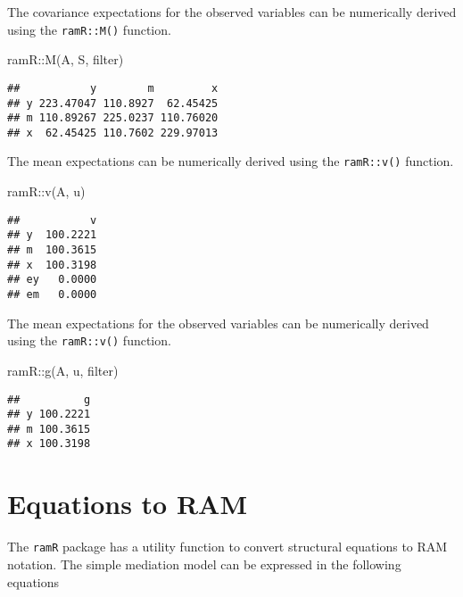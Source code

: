 \documentclass[
]{book}
\newenvironment{Shaded}{\begin{snugshade}}{\end{snugshade}}
\newcommand{\FunctionTok}[1]{\textcolor[rgb]{0.00,0.00,0.00}{#1}}
\newcommand{\NormalTok}[1]{#1}
\newcommand{\SpecialCharTok}[1]{\textcolor[rgb]{0.00,0.00,0.00}{#1}}
\theoremstyle{definition}
\theoremstyle{definition}
\theoremstyle{definition}
\theoremstyle{remark}
\begin{document}
The covariance expectations for the observed variables
can be numerically derived using the \texttt{ramR::M()} function.

\begin{Shaded}
\begin{Highlighting}[]
\NormalTok{ramR}\SpecialCharTok{::}\FunctionTok{M}\NormalTok{(A, S, filter)}
\end{Highlighting}
\end{Shaded}

\begin{verbatim}
##           y        m         x
## y 223.47047 110.8927  62.45425
## m 110.89267 225.0237 110.76020
## x  62.45425 110.7602 229.97013
\end{verbatim}

The mean expectations
can be numerically derived using the \texttt{ramR::v()} function.

\begin{Shaded}
\begin{Highlighting}[]
\NormalTok{ramR}\SpecialCharTok{::}\FunctionTok{v}\NormalTok{(A, u)}
\end{Highlighting}
\end{Shaded}

\begin{verbatim}
##           v
## y  100.2221
## m  100.3615
## x  100.3198
## ey   0.0000
## em   0.0000
\end{verbatim}

The mean expectations for the observed variables
can be numerically derived using the \texttt{ramR::v()} function.

\begin{Shaded}
\begin{Highlighting}[]
\NormalTok{ramR}\SpecialCharTok{::}\FunctionTok{g}\NormalTok{(A, u, filter)}
\end{Highlighting}
\end{Shaded}

\begin{verbatim}
##          g
## y 100.2221
## m 100.3615
## x 100.3198
\end{verbatim}

\hypertarget{equations-to-ram-2}{%
\section{Equations to RAM}\label{equations-to-ram-2}}

The \texttt{ramR} package has a utility function
to convert structural equations to RAM notation.
The simple mediation model
can be expressed in the following equations
\end{document}
